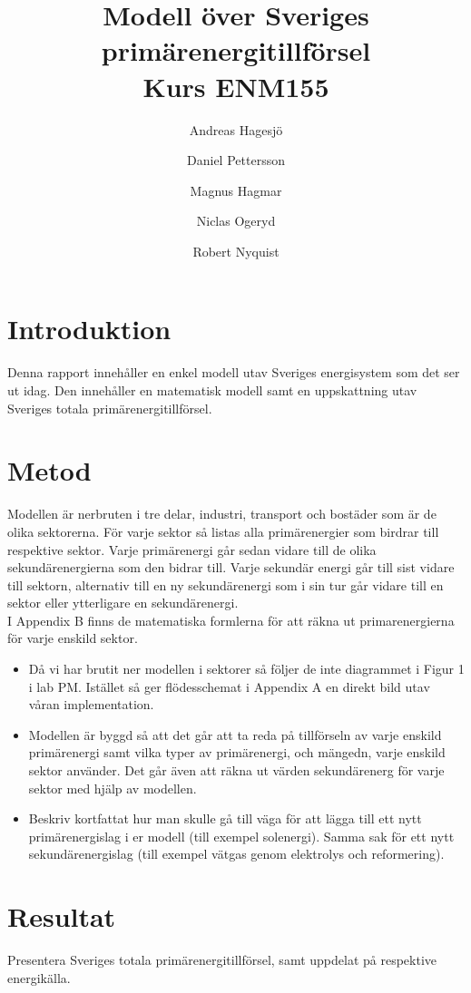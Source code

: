 \documentclass[a4paper,11pt,fleqn]{article}
\author{Andreas Hagesjö \and Daniel Pettersson \and
Magnus Hagmar \and Niclas Ogeryd \and Robert Nyquist}
\title{Modell över Sveriges primärenergitillförsel \\ Kurs ENM155}
\begin{document}
\maketitle
\newpage
{} 

\section{Introduktion}
Denna rapport innehåller en enkel modell utav Sveriges energisystem som det ser ut idag.
Den innehåller en matematisk modell samt en uppskattning utav Sveriges totala primärenergitillförsel.


\section{Metod}
Modellen är nerbruten i tre delar, industri, transport och bostäder som är de olika sektorerna.
För varje sektor så listas alla primärenergier som birdrar till respektive sektor. Varje primärenergi går sedan vidare till de olika sekundärenergierna som den bidrar till. Varje sekundär energi går till sist vidare till sektorn, alternativ till en ny sekundärenergi som i sin tur går vidare till en sektor eller ytterligare en sekundärenergi. \\
I Appendix B finns de matematiska formlerna för att räkna ut primarenergierna för varje enskild sektor.


\begin{itemize}
\item Då vi har brutit ner modellen i sektorer så följer de inte diagrammet i Figur 1 i lab PM.
Istället så ger flödesschemat i Appendix A en direkt bild utav våran implementation.


\item Modellen är byggd så att det går att ta reda på tillförseln av varje enskild primärenergi samt vilka typer av primärenergi, och mängedn, varje enskild sektor använder.
Det går även att räkna ut värden sekundärenerg för varje sektor med hjälp av modellen.

\item 

Beskriv kortfattat hur man skulle gå till väga för att lägga till ett
nytt primärenergislag i er modell (till exempel solenergi). Samma sak för
ett nytt sekundärenergislag (till exempel vätgas genom elektrolys och
reformering).
\end{itemize}

\section{Resultat}
Presentera Sveriges totala primärenergitillförsel, samt uppdelat på
respektive energikälla.
\end{document}

